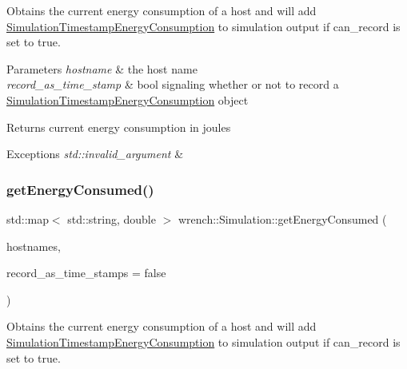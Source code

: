 Obtains the current energy consumption of a host and will add \hyperlink{classwrench_1_1_simulation_timestamp_energy_consumption}{Simulation\+Timestamp\+Energy\+Consumption} to simulation output if can\+\_\+record is set to true. 


\begin{DoxyParams}{Parameters}
{\em hostname} & the host name \\
\hline
{\em record\+\_\+as\+\_\+time\+\_\+stamp} & bool signaling whether or not to record a \hyperlink{classwrench_1_1_simulation_timestamp_energy_consumption}{Simulation\+Timestamp\+Energy\+Consumption} object \\
\hline
\end{DoxyParams}
\begin{DoxyReturn}{Returns}
current energy consumption in joules 
\end{DoxyReturn}

\begin{DoxyExceptions}{Exceptions}
{\em std\+::invalid\+\_\+argument} & \\
\hline
\end{DoxyExceptions}
\mbox{\label{classwrench_1_1_simulation_ae5ea0778a82f576168e00dd8e492623f}} 
\subsubsection{\texorpdfstring{get\+Energy\+Consumed()}{getEnergyConsumed()}\hspace{0.1cm}{\footnotesize\ttfamily [2/2]}}
{\footnotesize\ttfamily std\+::map$<$ std\+::string, double $>$ wrench\+::\+Simulation\+::get\+Energy\+Consumed (\begin{DoxyParamCaption}\item[{const std\+::vector$<$ std\+::string $>$ \&}]{hostnames,  }\item[{bool}]{record\+\_\+as\+\_\+time\+\_\+stamps = {\ttfamily false} }\end{DoxyParamCaption})}



Obtains the current energy consumption of a host and will add \hyperlink{classwrench_1_1_simulation_timestamp_energy_consumption}{Simulation\+Timestamp\+Energy\+Consumption} to simulation output if can\+\_\+record is set to true. 


